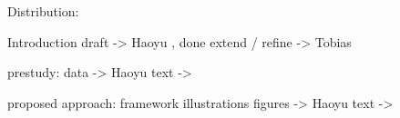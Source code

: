Distribution: 

Introduction
draft -> Haoyu , done 
extend / refine -> Tobias

prestudy: 
data -> Haoyu
text -> 

proposed approach:  
framework illustrations figures -> Haoyu
text -> 









